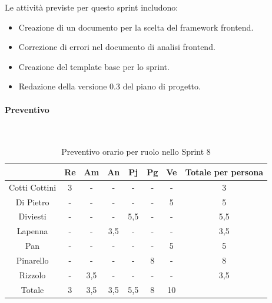 \documentclass{article}
\begin{document}
                Le attività previste per questo sprint includono:
                \begin{itemize}
                    \item Creazione di un documento per la scelta del framework frontend.
                    \item Correzione di errori nel documento di analisi frontend.
                    \item Creazione del template base per lo sprint.
                    \item Redazione della versione 0.3 del piano di progetto.
                \end{itemize}

                \paragraph{Preventivo}\mbox{}\\
                \begin{table}[H]
                    \centering
                    \begin{tabular}{|c|c|c|c|c|c|c|c|}
                    \hline
                                  & Re  & Am  & An  & Pj  & Pg  & Ve  & Totale per persona \\ \hline
                    Cotti Cottini & 3   & -   & -   & -   & -   & -   & 3                  \\ \hline
                    Di Pietro     & -   & -   & -   & -   & -   & 5   & 5                  \\ \hline
                    Diviesti      & -   & -   & -   & 5,5 & -   & -   & 5,5                \\ \hline
                    Lapenna       & -   & -   & 3,5 & -   & -   & -   & 3,5                \\ \hline
                    Pan           & -   & -   & -   & -   & -   & 5   & 5                  \\ \hline
                    Pinarello     & -   & -   & -   & -   & 8  & -   & 8                 \\ \hline
                    Rizzolo       & -   & 3,5 & -   & -   & -   & -   & 3,5                \\ \hline
                    Totale        & 3   & 3,5 & 3,5 & 5,5 & 8  & 10  &                    \\ \hline
                    \end{tabular}
                    \caption{Preventivo orario per ruolo nello Sprint 8}
                \end{table}
\end{document}
